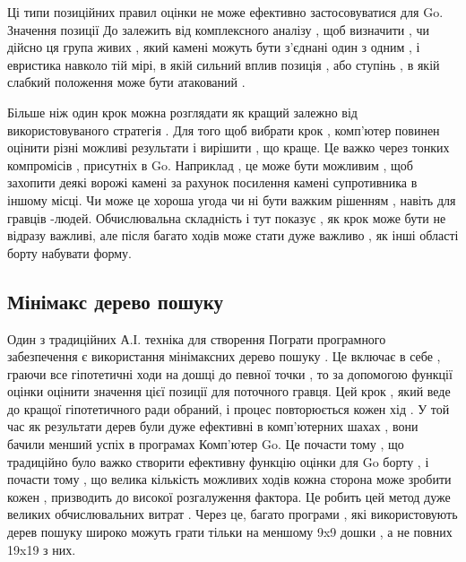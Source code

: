 Ці типи позиційних правил оцінки не може ефективно застосовуватися для Go. Значення позиції До залежить від комплексного аналізу , щоб визначити , чи дійсно ця група живих , який камені можуть бути з'єднані один з одним , і евристика навколо тій мірі, в якій сильний вплив позиція , або ступінь , в якій слабкий положення може бути атакований .

Більше ніж один крок можна розглядати як кращий залежно від використовуваного стратегія . Для того щоб вибрати крок , комп'ютер повинен оцінити різні можливі результати і вирішити , що краще. Це важко через тонких компромісів , присутніх в Go. Наприклад , це може бути можливим , щоб захопити деякі ворожі камені за рахунок посилення камені супротивника в іншому місці. Чи може це хороша угода чи ні бути важким рішенням , навіть для гравців -людей. Обчислювальна складність і тут показує , як крок може бути не відразу важливі, але після багато ходів може стати дуже важливо , як інші області борту набувати форму.
\subsection{Мінімакс дерево пошуку}
Один з традиційних А.І. техніка для створення Пограти програмного забезпечення є використання мінімаксних дерево пошуку . Це включає в себе , граючи все гіпотетичні ходи на дошці до певної точки , то за допомогою функції оцінки оцінити значення цієї позиції для поточного гравця. Цей крок , який веде до кращої гіпотетичного ради обраний, і процес повторюється кожен хід . У той час як результати дерев були дуже ефективні в комп'ютерних шахах , вони бачили менший успіх в програмах Комп'ютер Go. Це почасти тому , що традиційно було важко створити ефективну функцію оцінки для Go борту , і почасти тому , що велика кількість можливих ходів кожна сторона може зробити кожен , призводить до високої розгалуження фактора. Це робить цей метод дуже великих обчислювальних витрат . Через це, багато програми , які використовують дерев пошуку широко можуть грати тільки на меншому 9x9 дошки , а не повних 19x19 з них.

